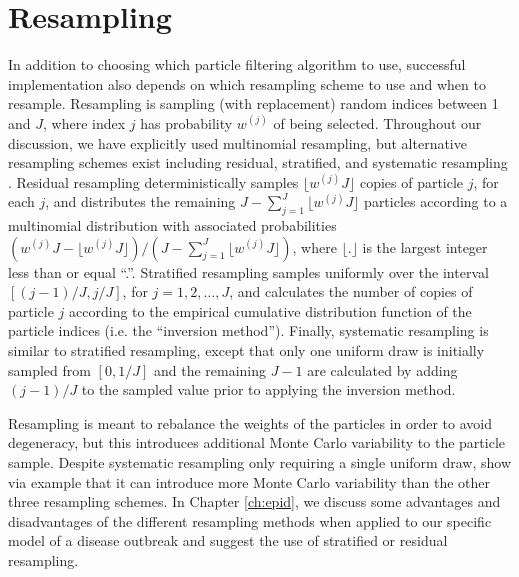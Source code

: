 \section{Resampling \label{sec:resample}}

In addition to choosing which particle filtering algorithm to use, successful implementation also depends on which resampling scheme to use and when to resample. Resampling is sampling (with replacement) random indices between 1 and $J$, where index $j$ has probability $w^{(j)}$ of being selected. Throughout our discussion, we have explicitly used multinomial resampling, but alternative resampling schemes exist including residual, stratified, and systematic resampling \citep{Douc:Capp:Moul:comp:2005}. Residual resampling deterministically samples $\lfloor w^{(j)} J \rfloor$ copies of particle $j$, for each $j$, and distributes the remaining $J - \sum^J_{j=1} \lfloor w^{(j)} J \rfloor$  particles according to a multinomial distribution with associated probabilities $(w^{(j)} J - \lfloor w^{(j)} J \rfloor) / (J - \sum^J_{j=1} \lfloor w^{(j)} J \rfloor)$, where $\lfloor . \rfloor$ is the largest integer less than or equal ``.''. Stratified resampling samples uniformly over the interval $[(j-1) / J, j / J]$, for $j = 1, 2, \ldots, J$, and calculates the number of copies of particle $j$ according to the empirical cumulative distribution function of the particle indices (i.e. the ``inversion method''). Finally, systematic resampling is similar to stratified resampling, except that only one uniform draw is initially sampled from $[0, 1/J]$ and the remaining $J-1$ are calculated by adding $(j-1) / J$ to the sampled value prior to applying the inversion method.

Resampling is meant to rebalance the weights of the particles in order to avoid degeneracy, but this introduces additional Monte Carlo variability to the particle sample. Despite systematic resampling only requiring a single uniform draw, \citet{Douc:Capp:Moul:comp:2005} show via example that it can introduce more Monte Carlo variability than the other three resampling schemes. In Chapter \ref{ch:epid}, we discuss some advantages and disadvantages of the different resampling methods when applied to our specific model of a disease outbreak and suggest the use of stratified or residual resampling.

